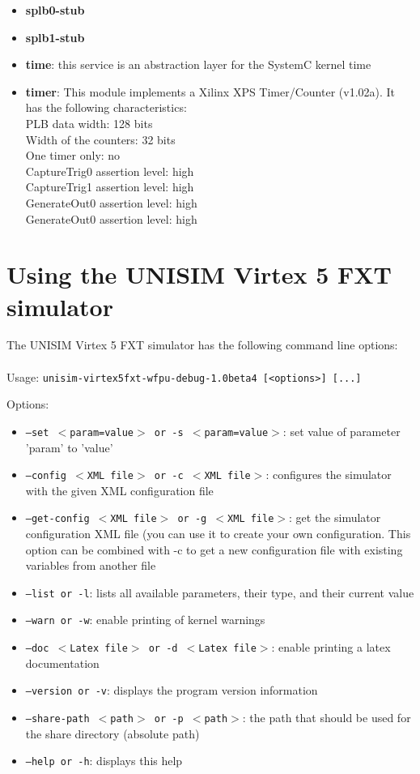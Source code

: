 \begin{itemize}
\item \textbf{splb0-stub}
\item \textbf{splb1-stub}
\item \textbf{time}: this service is an abstraction layer for the SystemC kernel time
\item \textbf{timer}: This module implements a Xilinx XPS Timer/Counter (v1.02a). It has the following characteristics:\\
PLB data width: 128 bits\\
Width of the counters: 32 bits\\
One timer only: no\\
CaptureTrig0 assertion level: high\\
CaptureTrig1 assertion level: high\\
GenerateOut0 assertion level: high\\
GenerateOut0 assertion level: high\\

\end{itemize}
\section{Using the UNISIM Virtex 5 FXT simulator}
\label{UNISIM Virtex 5 FXT_using}
The UNISIM Virtex 5 FXT simulator has the following command line options:\\
~\\
\noindent Usage: \texttt{unisim-virtex5fxt-wfpu-debug-1.0beta4 [<options>] [...]}

\noindent Options:
\begin{itemize}
\item \texttt{--set $<$param=value$>$ or -s $<$param=value$>$}: set value of parameter 'param' to 'value'
\item \texttt{--config $<$XML file$>$ or -c $<$XML file$>$}: configures the simulator with the given XML configuration file
\item \texttt{--get-config $<$XML file$>$ or -g $<$XML file$>$}: get the simulator configuration XML file (you can use it to create your own configuration. This option can be combined with -c to get a new configuration file with existing variables from another file
\item \texttt{--list or -l}: lists all available parameters, their type, and their current value
\item \texttt{--warn or -w}: enable printing of kernel warnings
\item \texttt{--doc $<$Latex file$>$ or -d $<$Latex file$>$}: enable printing a latex documentation
\item \texttt{--version or -v}: displays the program version information
\item \texttt{--share-path $<$path$>$ or -p $<$path$>$}: the path that should be used for the share directory (absolute path)
\item \texttt{--help or -h}: displays this help
\end{itemize}
